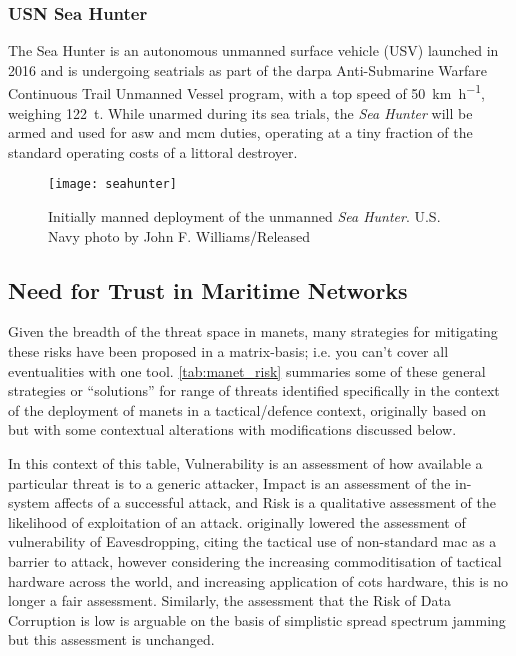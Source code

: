 \subsubsection{USN Sea Hunter}
The Sea Hunter is an autonomous unmanned surface vehicle (USV) launched in 2016 and is undergoing seatrials as part of the \gls{darpa} Anti-Submarine Warfare Continuous Trail Unmanned Vessel program, with a top speed of \SI{50}{\km\per\hour}, weighing \SI{122}{\tonne}.
While unarmed during its sea trials, the \emph{Sea Hunter} will be armed and used for \gls{asw} and \gls{mcm} duties, operating at a tiny fraction of the standard operating costs of a littoral destroyer.
\begin{figure}[h]
	\centering
	\texttt{[image: seahunter]}
	\caption[Initially manned deployment of the unmanned \emph{Sea Hunter}]{\label{fig:seahunter}Initially manned deployment of the unmanned \emph{Sea Hunter}. U.S. Navy photo by John F. Williams/Released}
\end{figure}

\subsection{Need for Trust in Maritime Networks}\label{sec:trust_in_marine}


Given the breadth of the threat space in \glspl{manet}, many strategies for mitigating these risks have been proposed in a matrix-basis; i.e. you can't cover all eventualities with one tool.
\autoref{tab:manet_risk} summaries some of these general strategies or ``solutions'' for range of threats identified specifically in the context of the deployment of \glspl{manet} in a tactical/defence context, originally based on~\citet{Kidston2010} but with some contextual alterations with modifications discussed below.

In this context of this table, Vulnerability is an assessment of how available a particular threat is to a generic attacker, Impact is an assessment of the in-system affects of a successful attack, and Risk is a qualitative assessment of the likelihood of exploitation of an attack.
\citet{Kidston2010} originally lowered the assessment of vulnerability of Eavesdropping, citing the tactical use of non-standard \gls{mac} as a barrier to attack, however considering the increasing commoditisation of tactical hardware across the world, and increasing application of \gls{cots} hardware, this is no longer a fair assessment.
Similarly, the assessment that the Risk of Data Corruption is low is arguable on the basis of simplistic spread spectrum jamming but this assessment is unchanged.

